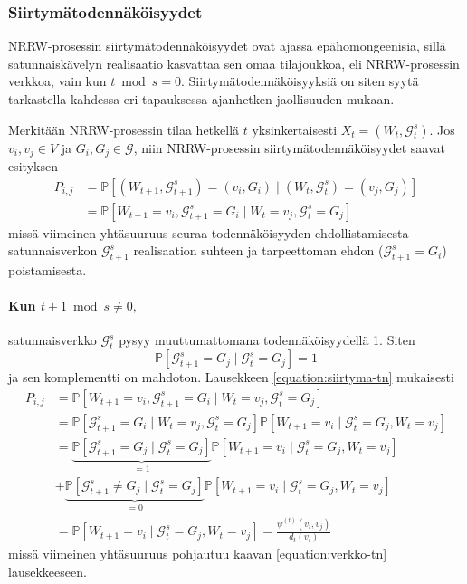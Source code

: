\documentclass[finnish, 12pt, a4paper, sci, utf8, pdfa]{aaltothesis}
\newcommand*{\prob}{\mathbb{P}}
\begin{document}
\subsubsection{Siirtymätodennäköisyydet}

NRRW-prosessin siirtymätodennäköisyydet ovat ajassa epähomongeenisia, sillä satunnaiskävelyn realisaatio kasvattaa sen omaa tilajoukkoa, eli NRRW-prosessin verkkoa, vain kun $ t \bmod s = 0 $. Siirtymätodennäköisyyksiä on siten syytä tarkastella kahdessa eri tapauksessa ajanhetken jaollisuuden mukaan. 

Merkitään NRRW-prosessin tilaa hetkellä $ t $ yksinkertaisesti $ X_{t} = (W_{t}, \mathcal{G}^{s}_{t}) $. Jos $ v_{i}, v_{j} \in V $ ja $ G_{i}, G_{j} \in \mathcal{G} $, niin NRRW-prosessin siirtymätodennäköisyydet saavat esityksen
\begin{align*}
   P_{i,j} &= \prob \left[ (W_{t+1}, \mathcal{G}^{s}_{t+1}) = (v_{i}, G_{i}) \mid (W_{t}, \mathcal{G}^{s}_{t}) = (v_{j}, G_{j}) \right] \\
   \quad &= \prob \left[ W_{t+1} = v_{i}, \mathcal{G}^{s}_{t+1} = G_{i} \mid W_{t} = v_{j}, \mathcal{G}^{s}_{t} = G_{j} \right]
   \label{equation:siirtyma-tn}
\end{align*}
missä viimeinen yhtäsuuruus seuraa todennäköisyyden ehdollistamisesta satunnaisverkon $ \mathcal{G}^{s}_{t+1} $ realisaation suhteen ja tarpeettoman ehdon ($ \mathcal{G}^{s}_{t+1} = G_{i} $) poistamisesta.

\paragraph{Kun $ t + 1 \bmod s \neq 0, $} satunnaisverkko $ \mathcal{G}^{s}_{t} $ pysyy muuttumattomana todennäköisyydellä 1. Siten
\[
   \prob \left[ \mathcal{G}^{s}_{t+1} = G_{j} \mid \mathcal{G}^{s}_{t} = G_{j} \right] = 1
\]
ja sen komplementti on mahdoton. Lausekkeen \ref{equation:siirtyma-tn} mukaisesti
\begin{align*}
   P_{i,j} &= \prob \left[ W_{t+1} = v_{i}, \mathcal{G}^{s}_{t+1} = G_{i} \mid W_{t} = v_{j}, \mathcal{G}^{s}_{t} = G_{j} \right] \\
   \quad &= \prob \left[ \mathcal{G}^{s}_{t+1} = G_{i} \mid W_{t} = v_{j}, \mathcal{G}^{s}_{t} = G_{j} \right] \prob \left[ W_{t+1} = v_{i} \mid \mathcal{G}^{s}_{t} = G_{j}, W_{t} = v_{j} \right] \\
   \quad &= \underbrace{\prob \left[ \mathcal{G}^{s}_{t+1} = G_{j} \mid \mathcal{G}^{s}_{t} = G_{j} \right]}_{= 1} \prob \left[ W_{t+1} = v_{i} \mid \mathcal{G}^{s}_{t} = G_{j}, W_{t} = v_{j} \right] \\
   \quad & + \underbrace{\prob \left[ \mathcal{G}^{s}_{t+1} \neq G_{j} \mid \mathcal{G}^{s}_{t} = G_{j} \right]}_{= 0} \prob \left[ W_{t+1} = v_{i} \mid \mathcal{G}^{s}_{t} = G_{j}, W_{t} = v_{j} \right] \\
   \quad &= \prob \left[ W_{t+1} = v_{i} \mid \mathcal{G}^{s}_{t} = G_{j}, W_{t} = v_{j} \right] = \frac{\psi^{(t)}(v_{i}, v_{j})}{d_{t}(v_{i})}
\end{align*}
missä viimeinen yhtäsuuruus pohjautuu kaavan \ref{equation:verkko-tn} lausekkeeseen.
\end{document}
